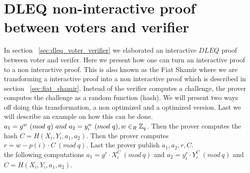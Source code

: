 \chapter{DLEQ non-interactive proof between voters and verifier}
\label{sec:dleq_non-interactive-proof-between_voters_and_verifier}
In section  ~\ref{sec:dleq_voter_verifier} we elaborated an interactive $DLEQ$ proof between voter and verifer. Here we present how one can turn an interactive proof to a non interactive proof. This is also known as the Fiat Shamir where we are transforming a interactive proof into a non interactive proof which is described in section ~\ref{sec:fiat_shamir}. Instead of the verifier computes a challenge, the prover computes the challenge as a random function (hash).  We will present two ways off doing this transformation, a non optimized and a optimized version. Last we will describe an example on how this can be done.\\


 \begin{math}a_1=g^w \ (mod\ q)  \ and \ a_2=y_i^w \ (mod\ q),  w\in_R \Z_q \end{math}. Then the prover computes the hash \begin{math}C=H(X_i,Y_i,a_1,a_2) \end{math}. Then the prover computes  \begin{math}r=w-p(i)  \cdot  C \ (mod\ q)\end{math}. Last the prover publish \begin{math}a_1, a_2,r,C\end{math}. \\

\noindent
{} the following computations \begin{math}a_1 = g^r \cdot X_i^C  \ (mod\ q)\end{math} and \begin{math} a_2=y_i^r  \cdot  Y_i^C \ (mod\ q)\end{math} and \begin{math}C=H(X_i,Y_i,a_1,a_2)\end{math}.


